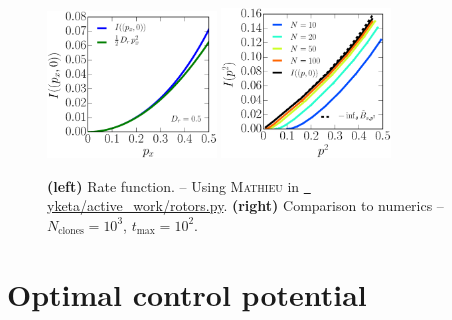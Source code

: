 \documentclass[pre,aps,superscriptaddress,nofootinbib]{revtex4}
\begin{document}
\begin{figure}[H]
\centering
\includegraphics[width=0.40\textwidth]{mathieu_rate.eps}
\includegraphics[width=0.40\textwidth]{rate_cloning.eps}
\caption{\textbf{(left)} Rate function. -- Using \textsc{Mathieu} in \href{https://github.com/yketa/active_work/blob/master/rotors.py}{\faGithub~ yketa/active\_work/rotors.py}. \textbf{(right)} Comparison to numerics -- $N_{\mathrm{clones}} = 10^3$, $t_{\mathrm{max}} = 10^2$.}
\label{mathieu_rate_fig}
\end{figure}

\section{Optimal control potential}
\end{document}
